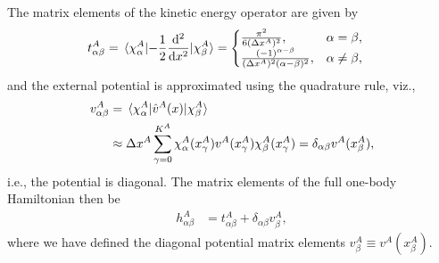 \documentclass[twocolumn,superscriptaddress,unsortedaddress,
 amsmath,amssymb,
 aps,
]{revtex4-2}
\begin{document}
        The matrix elements of the kinetic energy operator are
        given by \cite{colbert-sinc}
        \begin{align*}
            t^A_{\alpha \beta}
            &= \mel*{\chi^A_{\alpha}}{-\frac{1}{2} \dv[2]{}{x}}{
                \chi^A_{\beta}
            }
            = \begin{cases}
                \frac{\pi^2}{6 (\Delta x^A)^2}, & \alpha = \beta, \\
                \frac{(-1)^{\alpha - \beta}}{
                    (\Delta x^A)^2 (\alpha - \beta)^2
                },
                & \alpha \neq \beta,
            \end{cases}
        \end{align*}
        and the external potential is approximated using the quadrature
        rule, viz.,
        \begin{align*}
            v^A_{\alpha \beta}
            &= \mel*{\chi^A_{\alpha}}{\hat{v}^A(x)}{\chi^A_{\beta}}
            \\
            &\approx \Delta x^A
            \sum_{\gamma = 0}^{K^A}
            \chi^A_{\alpha}(x^A_{\gamma})
            v^A(x^A_{\gamma})
            \chi^A_{\beta}(x^A_{\gamma})
            = \delta_{\alpha \beta} v^A(x^A_{\beta}),
        \end{align*}
        i.e., the potential is diagonal.
        The matrix elements of the full one-body Hamiltonian then be
        \begin{align*}
            h^A_{\alpha \beta}
            &= t^A_{\alpha \beta}
            + \delta_{\alpha \beta}
            v^A_{\beta},
        \end{align*}
        where we have defined the diagonal potential matrix elements $v^A_{\beta} \equiv v^A(x^A_{\beta})$.
\end{document}
